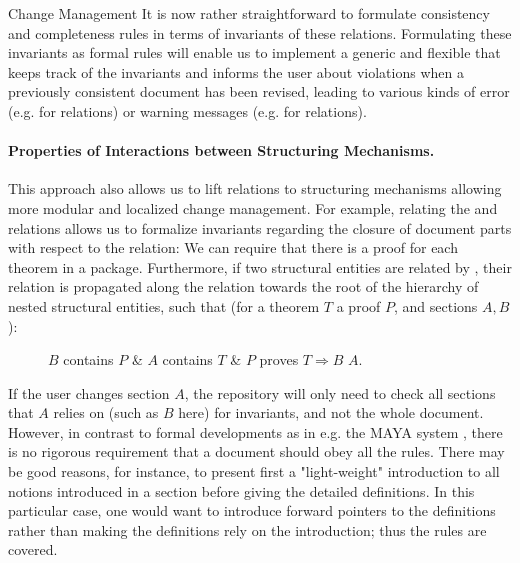 \begin{omgroup}[id=MMiSS,creators={bkb,amahnke}]
\begin{omgroup}{Change Management}
It is now rather straightforward to formulate consistency and completeness rules in terms
of invariants of these relations. Formulating these invariants as formal rules will enable
us to implement a generic and flexible {} that keeps track of
the invariants and informs the user about violations when a previously consistent document
has been revised, leading to various kinds of error (e.g. for {}
relations) or warning messages (e.g. for {} relations).


\paragraph{Properties of Interactions between Structuring Mechanisms.}
This approach also allows us to lift relations to structuring mechanisms allowing more
modular and localized change management.  For example, relating the {}
and {} relations allows us to formalize invariants regarding the closure
of document parts with respect to the {} relation: We can require that
there is a proof for each theorem in a package.  Furthermore, if two structural entities
are related by {}, their relation is propagated along the
{} relation towards the root of the hierarchy of nested structural
entities, such that (for a theorem $T$ a proof $P$, and sections $A, B$):

\begin{description}
\item[] $B$ contains $P$ \& $A$ contains $T$ \& $P$ proves $T \Rightarrow B$
  {} $A$.
\end{description}


If the user changes section $A$, the repository will only need to check all sections that
$A$ relies on (such as $B$ here) for invariants, and not the whole document. However, in
contrast to formal developments as in e.g. the MAYA system \cite{AH-05-a}, there is no
rigorous requirement that a document should obey all the rules.  There may be good
reasons, for instance, to present first a "light-weight" introduction to all notions
introduced in a section before giving the detailed definitions. In this particular case,
one would want to introduce forward pointers to the definitions rather than making the
definitions rely on the introduction; thus the rules are covered.


\end{omgroup}
\end{omgroup}
